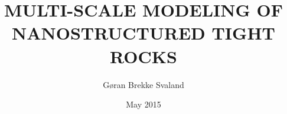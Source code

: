 \documentclass[twoside,english]{uiofysmaster}
\author{G\o{}ran Brekke Svaland}
\title{\uppercase{Multi-scale modeling of nanostructured tight rocks}}
\date{May 2015}
\begin{document}
\begin{titlepage}
\maketitle
\end{titlepage}
\end{document}

